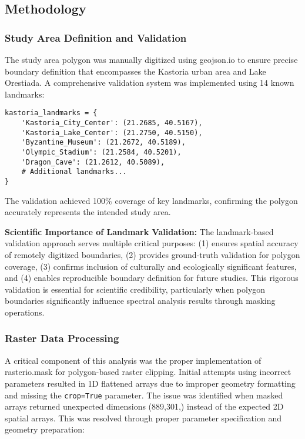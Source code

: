 \documentclass[a4paper,12pt]{article}
\begin{document}
\subsection{Methodology}

\subsubsection{Study Area Definition and Validation}

The study area polygon was manually digitized using geojson.io to ensure
precise boundary definition that encompasses the Kastoria urban area and Lake
Orestiada. A comprehensive validation system was implemented using 14 known
landmarks:

\begin{lstlisting}[caption=Landmark-based polygon validation system]
kastoria_landmarks = {
    'Kastoria_City_Center': (21.2685, 40.5167),
    'Kastoria_Lake_Center': (21.2750, 40.5150),
    'Byzantine_Museum': (21.2672, 40.5189),
    'Olympic_Stadium': (21.2584, 40.5201),
    'Dragon_Cave': (21.2612, 40.5089),
    # Additional landmarks...
}
\end{lstlisting}

The validation achieved 100\% coverage of key landmarks, confirming the polygon
accurately represents the intended study area.

\textbf{Scientific Importance of Landmark Validation:} The landmark-based
validation approach serves multiple critical purposes: (1) ensures spatial
accuracy of remotely digitized boundaries, (2) provides ground-truth validation
for polygon coverage, (3) confirms inclusion of culturally and ecologically
significant features, and (4) enables reproducible boundary definition for
future studies. This rigorous validation is essential for scientific credibility,
particularly when polygon boundaries significantly influence spectral analysis
results through masking operations.

\subsubsection{Raster Data Processing}

A critical component of this analysis was the proper implementation of
rasterio.mask for polygon-based raster clipping. Initial attempts using
incorrect parameters resulted in 1D flattened arrays due to improper geometry
formatting and missing the \texttt{crop=True} parameter. The issue was
identified when masked arrays returned unexpected dimensions (889,301,) instead
of the expected 2D spatial arrays. This was resolved through proper parameter
specification and geometry preparation:
\end{document}
